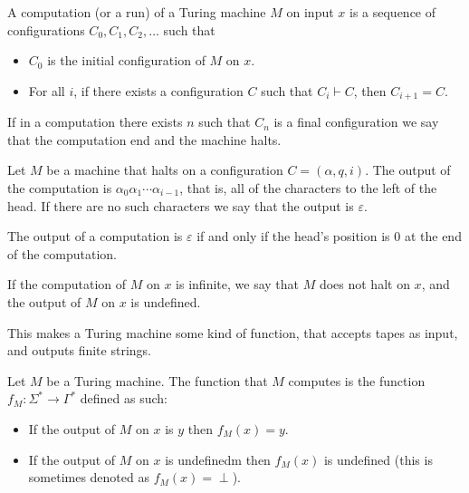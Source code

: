 \documentclass[11pt,a4paper]{article}
\begin{document}
  \begin{definition}[Computation]
    A computation (or a run) of a Turing machine $M$ on input $x$ is a
    sequence of configurations $C_0,C_1,C_2,\dots$ such that
    \begin{itemize}
      \item $C_0$ is the initial configuration of $M$ on $x$.
      \item For all $i$, if there exists a configuration $C$ such that
        $C_i \vdash C$, then $C_{i+1} = C$.
    \end{itemize}
  \end{definition}
  
  If in a computation there exists $n$ such that $C_n$ is a final 
  configuration we say that the computation end and the machine halts.

  \begin{definition}[Output]
    Let $M$ be a machine that halts on a configuration $C = (\alpha,q,i)$.
    The output of the computation is $\alpha_0 \alpha_1 \cdots \alpha_{i-1}$,
    that is, all of the characters to the left of the head.
    If there are no such characters we say that the output is $\varepsilon$.
  \end{definition}
  \begin{remark}
    The output of a computation is $\varepsilon$ if and only if the head's
    position is $0$ at the end of the computation.
  \end{remark}
  \begin{remark}
    If the computation of $M$ on $x$ is infinite, we say that $M$ does not
    halt on $x$, and the output of $M$ on $x$ is undefined.
  \end{remark}

  This makes a Turing machine some kind of function, that accepts tapes
  as input, and outputs finite strings.

  \begin{definition}
    Let $M$ be a Turing machine.
    The function that $M$ computes is the function
    $f_M \colon \Sigma^* \to \Gamma^*$ defined as such:
    \begin{itemize}
      \item If the output of $M$ on $x$ is $y$ then $f_M(x) = y$.
      \item If the output of $M$ on $x$ is undefinedm then $f_M(x)$
        is undefined (this is sometimes denoted as $f_M(x) = \perp$).
    \end{itemize}
  \end{definition}
\end{document}

